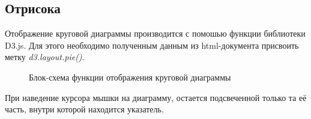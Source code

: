 \documentclass[a4paper,14pt]{extreport}
\begin{document}
\subsection{Отрисока}
\hspace{4ex}Отображение круговой диаграммы производится с помошью функции библиотеки D3.js. Для этого необходимо полученным данным из html-документа присвоить метку \textit{d3.layout.pie()}.\\
\begin{figure}[h]
\caption{Блок-схема функции отображения круговой диаграммы}
\label{ris:image}
\end{figure}
\hspace{4ex}При наведение курсора мышки на диаграмму, остается подсвеченной только та её часть, внутри которой находится указатель.
\end{document}
